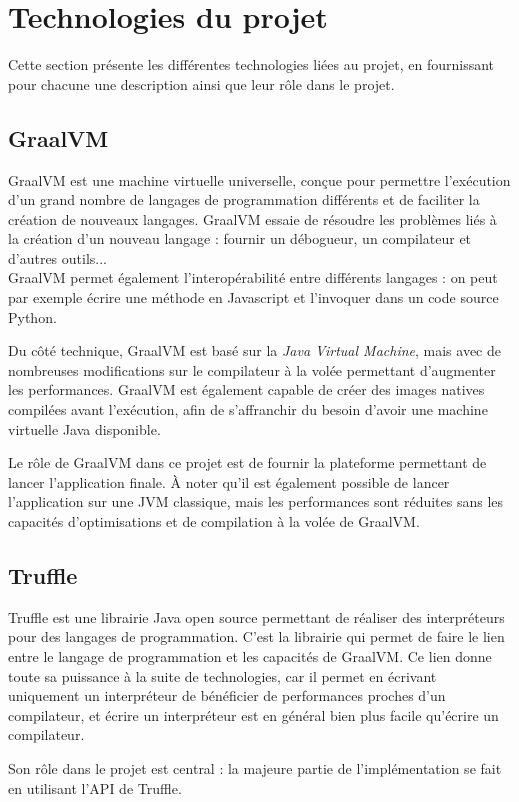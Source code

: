 \documentclass[../report.tex]{subfiles}
\begin{document}
\section{Technologies du projet}
Cette section présente les différentes technologies liées au projet, en fournissant pour chacune une description ainsi que leur rôle dans le projet.
\subsection{GraalVM}
GraalVM est une machine virtuelle universelle, conçue pour permettre l'exécution d'un grand nombre de langages de programmation différents et de faciliter la création de nouveaux langages. GraalVM essaie de résoudre les problèmes liés à la création d'un nouveau langage : fournir un débogueur, un compilateur et d'autres outils...\\
GraalVM permet également l'interopérabilité entre différents langages : on peut par exemple écrire une méthode en Javascript et l'invoquer dans un code source Python.

Du côté technique, GraalVM est basé sur la \textit{Java Virtual Machine}, mais avec de nombreuses modifications sur le compilateur à la volée permettant d'augmenter les performances. GraalVM est également capable de créer des images natives compilées avant l'exécution, afin de s'affranchir du besoin d'avoir une machine virtuelle Java disponible.

Le rôle de GraalVM dans ce projet est de fournir la plateforme permettant de lancer l'application finale. À noter qu'il est également possible de lancer l'application sur une JVM classique, mais les performances sont réduites sans les capacités d'optimisations et de compilation à la volée de GraalVM.
\subsection{Truffle}
Truffle est une librairie Java open source permettant de réaliser des interpréteurs pour des langages de programmation. C'est la librairie qui permet de faire le lien entre le langage de programmation et les capacités de GraalVM. Ce lien donne toute sa puissance à la suite de technologies, car il permet en écrivant uniquement un interpréteur de bénéficier de performances proches d'un compilateur, et écrire un interpréteur est en général bien plus facile qu'écrire un compilateur.

Son rôle dans le projet est central : la majeure partie de l'implémentation se fait en utilisant l'API de Truffle.
\end{document}
